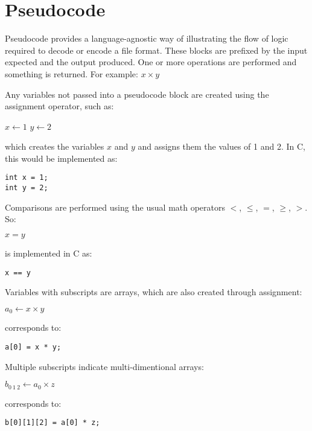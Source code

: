 \clearpage

\section{Pseudocode}

Pseudocode provides a language-agnostic way of illustrating the flow of logic
required to decode or encode a file format.
These blocks are prefixed by the input expected and the output produced.
One or more operations are performed and something is returned.
For example:
\Return $x \times y$\;
\EALGORITHM
\par
\noindent
Any variables not passed into a pseudocode block are created
using the assignment operator, such as:
\par
\noindent
\begin{algorithm}[H]
  \DontPrintSemicolon
  $x \leftarrow 1$\;
  $y \leftarrow 2$\;
\end{algorithm}
\par
\noindent
which creates the variables $x$ and $y$ and assigns them the values of 1 and 2.
In C, this would be implemented as:
\begin{Verbatim}[xleftmargin=.25in]
int x = 1;
int y = 2;
\end{Verbatim}
Comparisons are performed using the usual math operators
$<$, $\leq$, $=$, $\geq$, $>$.  So:
\par
\noindent
\begin{algorithm}[H]
  \DontPrintSemicolon
  $x = y$\;
\end{algorithm}
\par
\noindent
is implemented in C as:
\begin{Verbatim}[xleftmargin=.25in]
x == y
\end{Verbatim}
Variables with subscripts are arrays,
which are also created through assignment:
\par
\noindent
\begin{algorithm}[H]
  \DontPrintSemicolon
  $a_0 \leftarrow x \times y$\;
\end{algorithm}
\par
\noindent
corresponds to:
\begin{Verbatim}[xleftmargin=.25in]
a[0] = x * y;
\end{Verbatim}
Multiple subscripts indicate multi-dimentional arrays:
\par
\noindent
\begin{algorithm}[H]
  \DontPrintSemicolon
  $b_{0~1~2} \leftarrow a_0 \times z$\;
\end{algorithm}
\par
\noindent
corresponds to:
\begin{Verbatim}[xleftmargin=.25in]
b[0][1][2] = a[0] * z;
\end{Verbatim}

